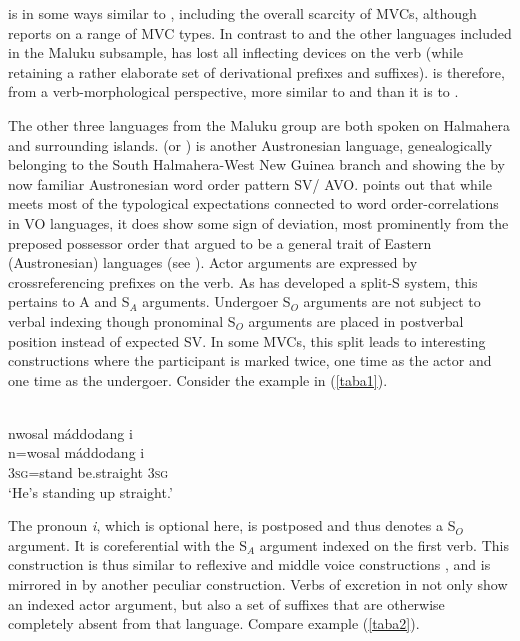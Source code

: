  is in some ways similar to , including the overall scarcity of MVCs, although \citet{grimes1991buru} reports on a range of MVC types. In contrast to  and the other languages included in the Maluku subsample,  has lost all inflecting devices on the verb (while retaining a rather elaborate set of derivational prefixes and suffixes).  is therefore, from a verb-morphological perspective, more similar to  and  than it is to .

The other three languages from the Maluku group are both spoken on Halmahera and surrounding islands.  (or ) is another Austronesian language, genealogically belonging to the South Halmahera-West New Guinea branch and showing the by now familiar Austronesian word order pattern SV/ AVO. \citet[144f.]{bowden2001taba} points out that while  meets most of the typological expectations connected to word order-correlations in VO languages, it does show some sign of deviation, most prominently from the preposed possessor order that \citet{Himmelmann2005austronesian} argued to be a general trait of Eastern  (Austronesian) languages (see ). Actor arguments are expressed by crossreferencing prefixes on the verb. As  has developed a split-S system, this pertains to A and S$_A$ arguments. Undergoer S$_O$ arguments are not subject to verbal indexing though pronominal S$_O$ arguments are placed in postverbal position instead of expected SV. In some MVCs, this split leads to interesting constructions where the participant is marked twice, one time as the actor and one time as the undergoer. Consider the example in (\ref{taba1}).

\ea \label{taba1}
\\
\glll nwosal máddodang i \\
n=wosal máddodang i \\
\textsc{3}\textsc{sg}=stand be.straight \textsc{3}\textsc{sg} \\
\glft `He's standing up straight.'  
\z

The pronoun \textit{i}, which is optional here, is postposed and thus denotes a S$_O$ argument. It is coreferential with the S$_A$ argument indexed on the first verb. This construction is thus similar to reflexive and middle voice constructions \citep[301]{bowden2001taba}, and is mirrored in  by another peculiar construction. Verbs of excretion in  not only show an indexed actor argument, but also a set of suffixes that are otherwise completely absent from that language. Compare example (\ref{taba2}).

